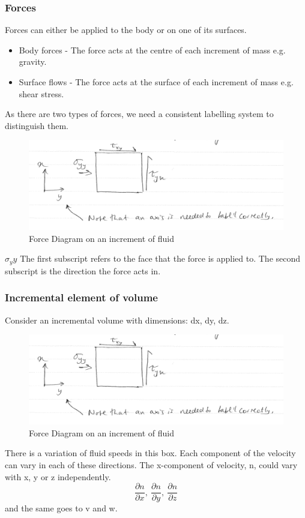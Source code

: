 \documentclass[class=report, crop=false, 12pt,a4paper]{standalone}
\begin{document}
\subsubsection{Forces}
Forces can either be applied to the body or on one of its surfaces.
\begin{itemize}[noitemsep]
  \item Body forces - The force acts at the centre of each increment of mass e.g. gravity.
  \item Surface flows - The force acts at the surface of each increment of mass e.g. shear stress.
\end{itemize}
As there are two types of forces, we need a consistent labelling system to distinguish them. 
\begin{figure}[H]
  \begin{center}
    \includegraphics[width = \textwidth]{../img/ForceDiagramFluids}
    \caption{Force Diagram on an increment of fluid}
  \end{center}
\end{figure}
\( \sigma_yy \) The first subscript refers to the face that the force is applied to. The second subscript is the direction the force acts in.
\subsubsection{Incremental element of volume}
Consider an incremental volume with dimensions: dx, dy, dz.
\begin{figure}[H]
  \begin{center}
    \includegraphics[width = \textwidth]{../img/ForceDiagramFluids}
    \caption{Force Diagram on an increment of fluid}
  \end{center}
\end{figure}
There is a variation of fluid speeds in this box. Each component of the velocity can vary in each of these directions. The x-component of velocity, n, could vary with x, y or z independently.
\[ \frac{\partial n}{\partial x}, \ \frac{\partial n}{\partial y}, \ \frac{\partial n}{\partial z} \]
and the same goes to v and w.
\end{document}
